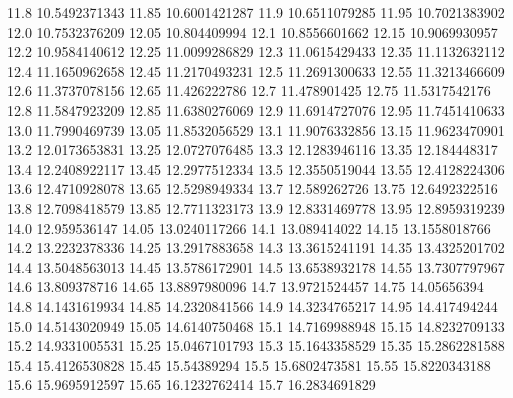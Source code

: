            11.8    10.5492371343
          11.85    10.6001421287
           11.9    10.6511079285
          11.95    10.7021383902
           12.0    10.7532376209
          12.05     10.804409994
           12.1    10.8556601662
          12.15    10.9069930957
           12.2    10.9584140612
          12.25    11.0099286829
           12.3    11.0615429433
          12.35    11.1132632112
           12.4    11.1650962658
          12.45    11.2170493231
           12.5    11.2691300633
          12.55    11.3213466609
           12.6    11.3737078156
          12.65     11.426222786
           12.7     11.478901425
          12.75    11.5317542176
           12.8    11.5847923209
          12.85    11.6380276069
           12.9    11.6914727076
          12.95    11.7451410633
           13.0    11.7990469739
          13.05    11.8532056529
           13.1    11.9076332856
          13.15    11.9623470901
           13.2    12.0173653831
          13.25    12.0727076485
           13.3    12.1283946116
          13.35     12.184448317
           13.4    12.2408922117
          13.45    12.2977512334
           13.5    12.3550519044
          13.55    12.4128224306
           13.6    12.4710928078
          13.65    12.5298949334
           13.7     12.589262726
          13.75    12.6492322516
           13.8    12.7098418579
          13.85    12.7711323173
           13.9    12.8331469778
          13.95    12.8959319239
           14.0     12.959536147
          14.05    13.0240117266
           14.1     13.089414022
          14.15    13.1558018766
           14.2    13.2232378336
          14.25    13.2917883658
           14.3    13.3615241191
          14.35    13.4325201702
           14.4    13.5048563013
          14.45    13.5786172901
           14.5    13.6538932178
          14.55    13.7307797967
           14.6     13.809378716
          14.65    13.8897980096
           14.7    13.9721524457
          14.75      14.05656394
           14.8    14.1431619934
          14.85    14.2320841566
           14.9    14.3234765217
          14.95     14.417494244
           15.0    14.5143020949
          15.05    14.6140750468
           15.1    14.7169988948
          15.15    14.8232709133
           15.2    14.9331005531
          15.25    15.0467101793
           15.3    15.1643358529
          15.35    15.2862281588
           15.4    15.4126530828
          15.45      15.54389294
           15.5    15.6802473581
          15.55    15.8220343188
           15.6    15.9695912597
          15.65    16.1232762414
           15.7    16.2834691829
